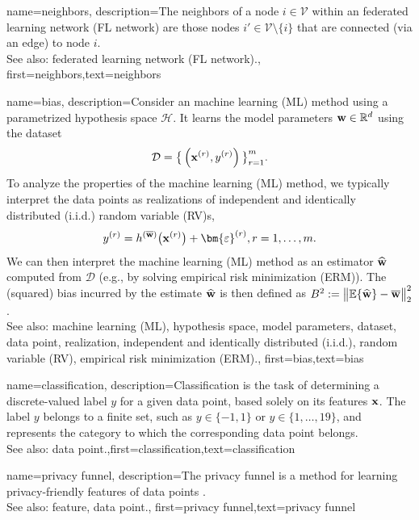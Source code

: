 {
	name={neighbors},
	description={The neighbors of a node $i \in \mathcal{V}$ 
	within an federated learning network (FL network) are those nodes $i' \in \mathcal{V} \setminus \{ i\}$ that are connected (via an edge) to node $i$.
				\\ 
		See also: federated learning network (FL network).},
	first={neighbors},text={neighbors} 
}

{
	name={bias},
	description={Consider an machine learning (ML) method using a parametrized hypothesis space $\mathcal{H}$. 
		It learns the model parameters ${\bf w} \in \mathbb{R}^{d}$ using the dataset $$ \mathcal{D}=\big\{ \left( {\bf x}^{(r)},y^{(r)} \right) \big\}_{r=1}^{m}.$$ 
		To analyze the properties of the machine learning (ML) method, we typically interpret the data points as realizations 
		of independent and identically distributed (i.i.d.) random variable (RV)s, $$ y^{(r)} = h^{(\overline{{\bf w}})}\big( {\bf x}^{(r)} \big) + \bm{\varepsilon}^{(r)}, r=1,\ldots,m.$$ 
		We can then interpret the machine learning (ML) method as an estimator $\widehat{{\bf w}}$ 
		computed from $\mathcal{D}$ (e.g., by solving empirical risk minimization (ERM)). The (squared) bias incurred by the estimate $\widehat{{\bf w}}$ 
		is then defined as $B^{2} := \big\| \mathbb{E}  \{ \widehat{{\bf w}}  \}- \overline{{\bf w}}\big\|_{2}^{2}$.
					\\ 
		See also: machine learning (ML), hypothesis space, model parameters, dataset, data point, realization, independent and identically distributed (i.i.d.), random variable (RV), empirical risk minimization (ERM).},
first={bias},text={bias} 
}

{name={classification},
 description={Classification is the task of determining a 
 	discrete-valued label $y$ for a given data point, based solely on its 
 	features ${\bf x}$. The label $y$ belongs to a finite set, such as 
 	$y \in \{-1,1\}$ or $y \in \{1,\ldots,19\}$, and represents the 
 	category to which the corresponding data point belongs.
				\\ 
		See also: data point.},first={classification},text={classification} 
}



{name={privacy funnel},
 description={The privacy funnel is a method for learning privacy-friendly features 
	of data points \cite{PrivacyFunnel}.
				\\ 
		See also: feature, data point.},
 first={privacy funnel},text={privacy funnel} 
}




